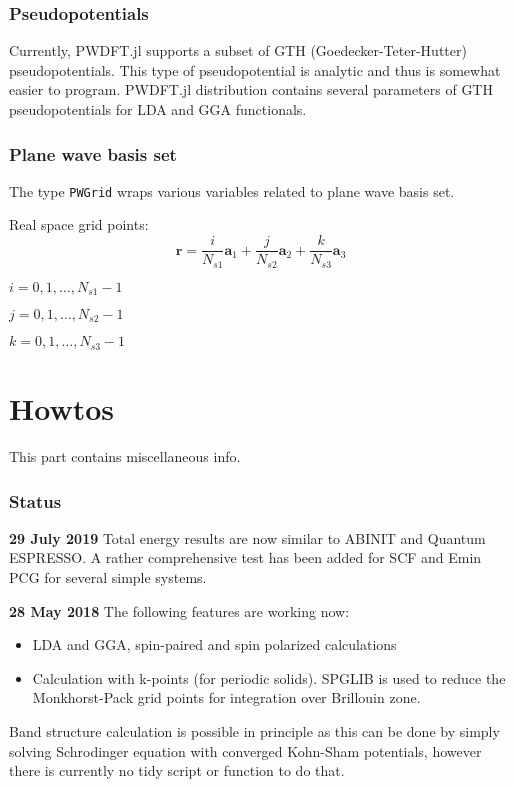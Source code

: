 \documentclass[a4paper,10pt]{article}
\newcommand{\jlinline}[1]{\texttt{#1}}
\begin{document}
\section{Pseudopotentials}
%
Currently, \textsf{PWDFT.jl} supports a subset of GTH (Goedecker-Teter-Hutter)
pseudopotentials. This type of pseudopotential is analytic and thus is somewhat
easier to program.
%
\textsf{PWDFT.jl} distribution contains several parameters
of GTH pseudopotentials for LDA and GGA functionals.


\section{Plane wave basis set}

The type \jlinline{PWGrid} wraps various variables related to plane wave basis
set.

Real space grid points:
$$
\mathbf{r} = \frac{i}{N_{s1}}\mathbf{a}_{1} + \frac{j}{N_{s2}}\mathbf{a}_{2} +
\frac{k}{N_{s3}}\mathbf{a}_{3}
$$

$i = 0,1,\ldots,N_{s1}-1$

$j = 0,1,\ldots,N_{s2}-1$

$k = 0,1,\ldots,N_{s3}-1$


\part{Howtos}

This part contains miscellaneous info.




\section*{Status}

\textbf{29 July 2019} Total energy results are now similar to ABINIT
and Quantum ESPRESSO. A rather comprehensive test has been added
for SCF and Emin PCG for several simple systems.


\textbf{28 May 2018} The following features are working now:
\begin{itemize}
\item LDA and GGA, spin-paired and spin polarized calculations
\item Calculation with k-points (for periodic solids).
  \textsf{SPGLIB} is used to reduce the Monkhorst-Pack grid points
  for integration over Brillouin zone.
\end{itemize}

Band structure calculation is possible in principle as this can be
done by simply solving
Schrodinger equation with converged Kohn-Sham potentials, however there
is currently no tidy script or function to do that.
\end{document}
